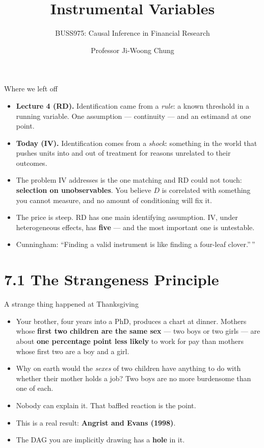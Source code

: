\documentclass[
  11pt,
  ignorenonframetext,
  aspectratio=169,
]{beamer}
\title{\texorpdfstring{Instrumental Variables}{Instrumental Variables}}
\subtitle{\texorpdfstring{BUSS975: Causal Inference in Financial
Research}{BUSS975: Causal Inference in Financial Research}}
\author{Professor Ji-Woong Chung}
\date{}
\institute{Korea University}
\providecommand{\tightlist}{%
  \setlength{\itemsep}{0pt}\setlength{\parskip}{0pt}}
\begin{document}
\frame{\titlepage}


\begin{frame}{Where we left off}
\protect{}\label{where-we-left-off}
\begin{itemize}
\tightlist
\item
  \textbf{Lecture 4 (RD).} Identification came from a \emph{rule}: a
  known threshold in a running variable. One assumption --- continuity
  --- and an estimand at one point.
\item
  \textbf{Today (IV).} Identification comes from a \emph{shock}:
  something in the world that pushes units into and out of treatment for
  reasons unrelated to their outcomes.
\item
  The problem IV addresses is the one matching and RD could not touch:
  \textbf{selection on unobservables}. You believe \(D\) is correlated
  with something you cannot measure, and no amount of conditioning will
  fix it.
\item
  The price is steep. RD has one main identifying assumption. IV, under
  heterogeneous effects, has \textbf{five} --- and the most important
  one is untestable.
\item
  Cunningham: ``Finding a valid instrument is like finding a four-leaf
  clover.''\,''
\end{itemize}
\end{frame}

\section{7.1 The Strangeness Principle}\label{the-strangeness-principle}

\begin{frame}{A strange thing happened at Thanksgiving}
\protect{}\label{a-strange-thing-happened-at-thanksgiving}
\begin{itemize}
\tightlist
\item
  Your brother, four years into a PhD, produces a chart at dinner.
  Mothers whose \textbf{first two children are the same sex} --- two
  boys or two girls --- are about \textbf{one percentage point less
  likely} to work for pay than mothers whose first two are a boy and a
  girl.
\item
  Why on earth would the \emph{sexes} of two children have anything to
  do with whether their mother holds a job? Two boys are no more
  burdensome than one of each.
\item
  Nobody can explain it. That baffled reaction is the point.
\item
  This is a real result: \textbf{Angrist and Evans (1998)}.
\end{itemize}

\vspace{0.4em}

\begin{itemize}
\tightlist
\item
  The DAG you are implicitly drawing has a \textbf{hole} in it.
\end{itemize}
\end{frame}
\end{document}
